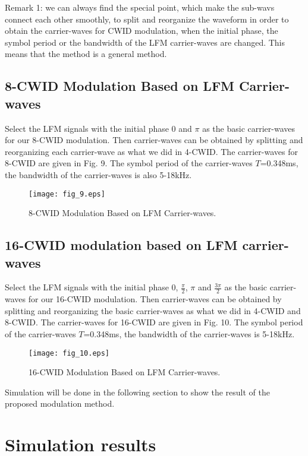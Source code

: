 \documentclass[journal]{IEEEtran}
\begin{document}
Remark 1: we can always find the special point, which make the
sub-wavs connect each other smoothly, to split and reorganize the
waveform in order to obtain the carrier-waves for CWID modulation,
when the initial phase, the symbol period or the bandwidth of the
LFM carrier-waves are changed. This means that the method is a
general method.
\subsection{8-CWID Modulation Based on LFM Carrier-waves}
Select the LFM signals with the initial phase 0 and $\pi$ as the
basic carrier-waves for our 8-CWID modulation. Then carrier-waves
can be obtained by splitting and reorganizing each carrier-wave as
what we did in 4-CWID. The carrier-waves for 8-CWID are given in
Fig. 9. The symbol period of the carrier-waves $T$=0.348ms, the
bandwidth of the carrier-waves is also 5-18kHz.
\begin{figure*}[!t]
\centering
\texttt{[image: fig\_9.eps]}
\caption{8-CWID Modulation Based on LFM Carrier-waves.}
\label{fig_sim}
\end{figure*}
\subsection{16-CWID modulation based on LFM carrier-waves}
Select the LFM signals with the initial phase 0, $\frac{\pi}{2}$,
$\pi$ and $\frac{{3\pi}}{2}$ as the basic carrier-waves for our
16-CWID modulation. Then carrier-waves can be obtained by splitting
and reorganizing the basic carrier-waves as what we did in 4-CWID
and 8-CWID. The carrier-waves for 16-CWID are given in Fig. 10. The
symbol period of the carrier-waves $T$=0.348ms, the bandwidth of the
carrier-waves is 5-18kHz.
\begin{figure*}[!t]
\centering
\texttt{[image: fig\_10.eps]}
\caption{16-CWID Modulation Based on LFM Carrier-waves.}
\label{fig_sim}
\end{figure*}

Simulation will be done in the following section to show the result
of the proposed modulation method.
\section{Simulation results}
\end{document}
